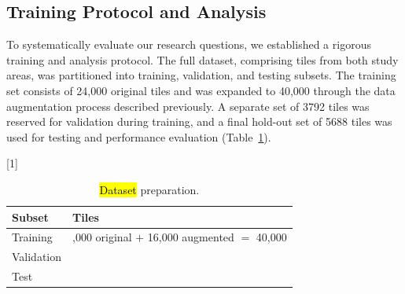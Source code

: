 \documentclass[remotesensing,article,accept,pdftex,moreauthors]{Definitions/mdpi}
\begin{document}
\subsection{Training Protocol and Analysis}
\label{sec:study_design}
To systematically evaluate our research questions, we established a rigorous training and analysis protocol. The full dataset, comprising tiles from both study areas, was partitioned into training, validation, and testing subsets. The training set consists of 24,000 original tiles and was expanded to 40,000 through the data augmentation process described previously. A separate set of 3792 tiles was reserved for validation during training, and a final hold-out set of 5688 tiles was used for testing and performance evaluation \mbox{(Table \ref{tab:data_prep})}.
\begin{table}[H]

  \caption{\hl{Dataset} %
 preparation.}
  \label{tab:data_prep}
  \setlength{\cellWidtha}{\textwidth/2-2\tabcolsep-0.5in}
\setlength{\cellWidthb}{\textwidth/2-2\tabcolsep+0.5in}
\scalebox{1}[1]{\begin{tabularx}{\textwidth}{>{\centering\arraybackslash}m{\cellWidtha}>{\centering\arraybackslash}m{\cellWidthb}}
    \toprule
    \textbf{Subset} & \textbf{Tiles} \\
    \midrule
    Training        & 24,000 original $+$ 16,000 augmented $=$ 40,000 \\
    Validation      & 3792 \\
    Test            & 5688 \\
    \bottomrule
  \end{tabularx}}
\end{table}
\end{document}
